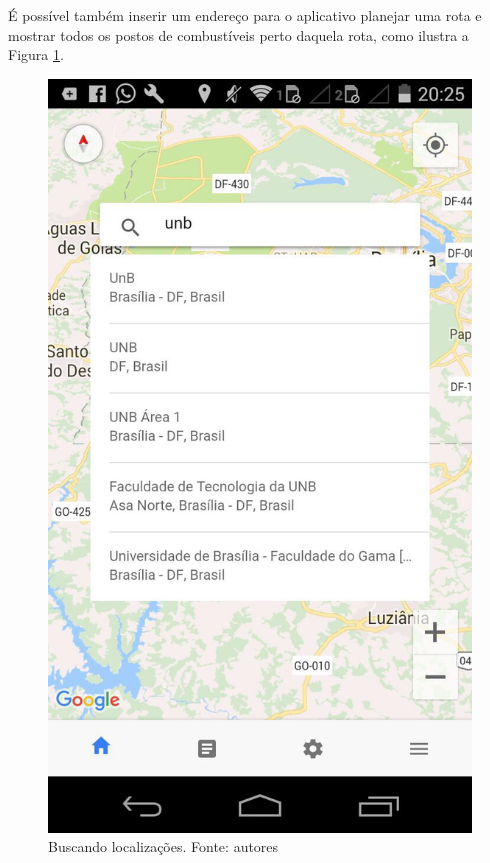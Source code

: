 É possível também inserir um endereço para o aplicativo planejar uma rota e mostrar todos os postos de combustíveis perto daquela rota, como ilustra a Figura \ref{img:buscando_localizacoes}.

\begin{figure}[H]
    \centering
    \includegraphics[scale=0.3]{figuras/app_3.jpg}
    \caption[Buscando localizações]{Buscando localizações. Fonte: autores}
    \label{img:buscando_localizacoes}
\end{figure}
